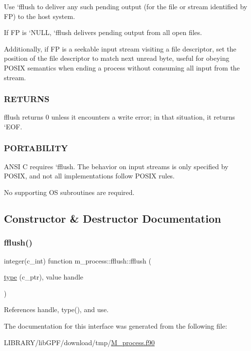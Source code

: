 Use `fflush\textquotesingle{} to deliver any such pending output (for the file or stream identified by FP) to the host system.

If FP is `\+N\+U\+LL\textquotesingle{}, `fflush\textquotesingle{} delivers pending output from all open files.

Additionally, if FP is a seekable input stream visiting a file descriptor, set the position of the file descriptor to match next unread byte, useful for obeying P\+O\+S\+IX semantics when ending a process without consuming all input from the stream. \subsubsection*{R\+E\+T\+U\+R\+NS}

fflush returns \textquotesingle{}0\textquotesingle{} unless it encounters a write error; in that situation, it returns `\+E\+OF\textquotesingle{}. \subsubsection*{P\+O\+R\+T\+A\+B\+I\+L\+I\+TY}

A\+N\+SI C requires `fflush\textquotesingle{}. The behavior on input streams is only specified by P\+O\+S\+IX, and not all implementations follow P\+O\+S\+IX rules.

No supporting OS subroutines are required. 

\subsection{Constructor \& Destructor Documentation}
\mbox{\label{interfacem__process_1_1fflush_a77d0db933d548b3ee20b064e705a408e}} 
\subsubsection{\texorpdfstring{fflush()}{fflush()}}
{\footnotesize\ttfamily integer(c\+\_\+int) function m\+\_\+process\+::fflush\+::fflush (\begin{DoxyParamCaption}\item[{\hyperlink{stop__watch_83_8txt_a70f0ead91c32e25323c03265aa302c1c}{type} (c\+\_\+ptr), value}]{handle }\end{DoxyParamCaption})\hspace{0.3cm}{\ttfamily [private]}}



References handle, type(), and use.



The documentation for this interface was generated from the following file\+:\begin{DoxyCompactItemize}
\item 
L\+I\+B\+R\+A\+R\+Y/lib\+G\+P\+F/download/tmp/\hyperlink{M__process_8f90}{M\+\_\+process.\+f90}\end{DoxyCompactItemize}
